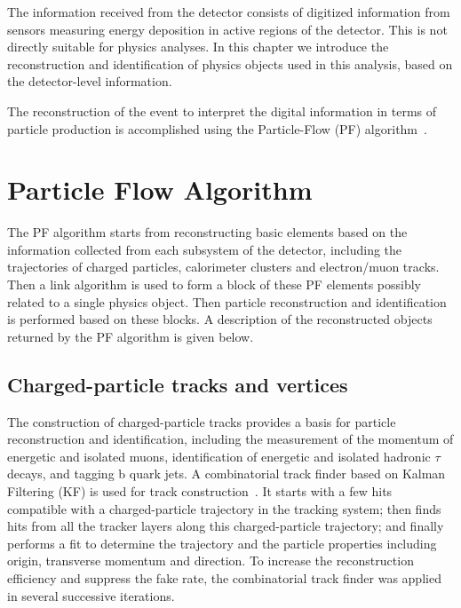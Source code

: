 The information received from the detector consists of digitized information from sensors measuring energy deposition in active regions of the detector. This is not directly suitable for physics analyses. In this chapter we introduce the reconstruction and identification of physics objects used in this analysis, based on the detector-level information. 

\vspace{0.3cm}
The reconstruction of the event to interpret the digital information in terms of particle production is accomplished using the Particle-Flow (PF) algorithm~\cite{ob_pf}.

\section{Particle Flow Algorithm}
The PF algorithm starts from reconstructing basic elements based on the information collected from each subsystem of the detector, including the trajectories of charged particles, calorimeter clusters and electron/muon tracks. Then a link algorithm is used to form a block of these PF elements possibly related to a single physics object. Then particle reconstruction and identification is performed based on these blocks. A description of the reconstructed objects returned by the PF algorithm is given below.

\subsection{Charged-particle tracks and vertices}
The construction of charged-particle tracks provides a basis for particle reconstruction and identification, including the measurement of the momentum of energetic and isolated muons, identification of energetic and isolated hadronic $\tau$ decays, and tagging b quark jets. A combinatorial track finder based on Kalman Filtering (KF) is used for track construction~\cite{ob_trackconst1,ob_trackconst2}. It starts with a few hits compatible with a charged-particle trajectory in the tracking system; then finds hits from all the tracker layers along this charged-particle trajectory; and finally performs a fit to determine the trajectory and the particle properties including origin, transverse momentum and direction. To increase the reconstruction efficiency and suppress the fake rate, the combinatorial track finder was applied in several successive iterations.


